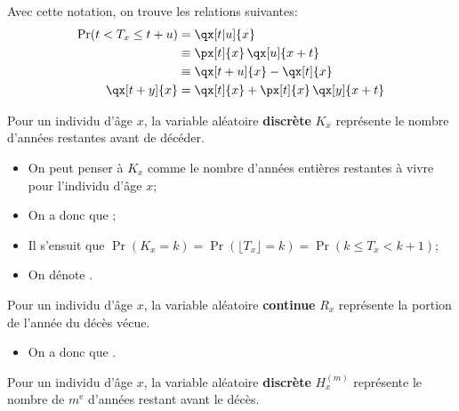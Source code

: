 \documentclass[10pt, french]{article}
\begin{document}
\begin{multicols*}{3}
\begin{definitionNOHFILLsub}
\tcbline

Avec cette notation, on trouve les relations suivantes:
\begin{align*}
	\Pr(t	<	T_{x}	\leq	t + u)
	&= \qx[t|u]{x}	\\
	&\equiv \px[t]{x} \, \qx[u]{x+t}	\\
	&\equiv \qx[t + u]{x} - \qx[t]{x}	\\
	\qx[t + y]{x} 
	&= \qx[t]{x} + \px[t]{x} \, \qx[y]{x + t}
\end{align*}
\end{definitionNOHFILLsub}


\begin{definitionNOHFILLsub}
Pour un individu d'âge $x$, la variable aléatoire \textbf{discrète} $K_{x}$ représente le nombre d'années restantes avant de décéder.\\

\begin{itemize}
	\item	On peut penser à $K_{x}$ comme le nombre d'années entières restantes à vivre pour l'individu d'âge $x$;
	\item	On a donc que ;
	\item	Il s'ensuit que $\Pr(K_x = k)	=	\Pr(\lfloor T_{x} \rfloor = k)	=	\Pr(k	\leq	T_{x}	< k + 1)$;
	\item	On dénote .
\end{itemize}
\end{definitionNOHFILLsub}


\begin{definitionNOHFILLsub}
Pour un individu d'âge $x$, la variable aléatoire \textbf{continue} $R_{x}$ représente la portion de l'année du décès vécue.\\

\begin{itemize}
	\item	On a donc que .
\end{itemize}
\end{definitionNOHFILLsub}


\begin{definitionNOHFILLsub}
Pour un individu d'âge $x$, la variable aléatoire \textbf{discrète} $H^{(m)}_{x}$ représente le nombre de $m^{\text{e}}$ d'années restant avant le décès.\\


\end{definitionNOHFILLsub}
\end{multicols*}
\end{document}
